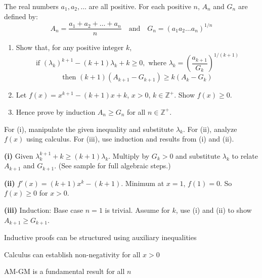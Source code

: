 \begin{problem}
The real numbers $a_1, a_2, \dots$ are all positive. For each positive $n$, $A_n$ and $G_n$ are defined by:
\[ A_n = \frac{a_1 + a_2 + \dots + a_n}{n} \quad \text{and} \quad G_n = (a_1 a_2 \dots a_n)^{1/n} \]
\begin{enumerate}[label=(\roman*)]
    \item Show that, for any positive integer $k$,
    \[ \text{if } (\lambda_k)^{k+1} - (k+1)\lambda_k + k \geq 0, \text{ where } \lambda_k = \left( \frac{a_{k+1}}{G_k} \right)^{1/(k+1)} \]
    \[ \text{then } (k+1)(A_{k+1} - G_{k+1}) \geq k(A_k - G_k) \]
    \item Let $f(x) = x^{k+1} - (k+1)x + k$, $x > 0$, $k \in \mathbb{Z}^+$. Show $f(x) \geq 0$.
    \item Hence prove by induction $A_n \geq G_n$ for all $n \in \mathbb{Z}^+$.
\end{enumerate}
\end{problem}

\begin{hint}
For (i), manipulate the given inequality and substitute $\lambda_k$. For (ii), analyze $f(x)$ using calculus. For (iii), use induction and results from (i) and (ii).
\end{hint}

\begin{solution}
	\textbf{(i)} Given $\lambda_k^{k+1} + k \geq (k+1)\lambda_k$. Multiply by $G_k > 0$ and substitute $\lambda_k$ to relate $A_{k+1}$ and $G_{k+1}$. (See sample for full algebraic steps.)

	\textbf{(ii)} $f'(x) = (k+1)x^k - (k+1)$. Minimum at $x=1$, $f(1)=0$. So $f(x) \geq 0$ for $x > 0$.

	\textbf{(iii)} Induction: Base case $n=1$ is trivial. Assume for $k$, use (i) and (ii) to show $A_{k+1} \geq G_{k+1}$.
\end{solution}

\begin{takeaways}
\item Inductive proofs can be structured using auxiliary inequalities
\item Calculus can establish non-negativity for all $x > 0$
\item AM-GM is a fundamental result for all $n$
\end{takeaways}
